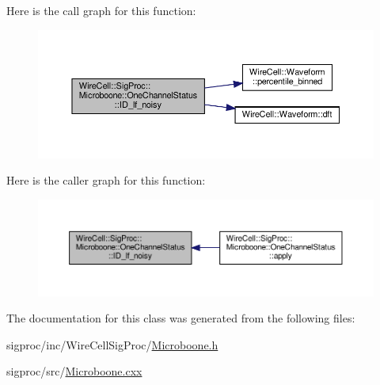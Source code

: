 Here is the call graph for this function\+:
\nopagebreak
\begin{figure}[H]
\begin{center}
\leavevmode
\includegraphics[width=350pt]{class_wire_cell_1_1_sig_proc_1_1_microboone_1_1_one_channel_status_a3836d07fe79d2efedd72838ac4e13d92_cgraph}
\end{center}
\end{figure}
Here is the caller graph for this function\+:
\nopagebreak
\begin{figure}[H]
\begin{center}
\leavevmode
\includegraphics[width=350pt]{class_wire_cell_1_1_sig_proc_1_1_microboone_1_1_one_channel_status_a3836d07fe79d2efedd72838ac4e13d92_icgraph}
\end{center}
\end{figure}


The documentation for this class was generated from the following files\+:\begin{DoxyCompactItemize}
\item 
sigproc/inc/\+Wire\+Cell\+Sig\+Proc/\hyperlink{_microboone_8h}{Microboone.\+h}\item 
sigproc/src/\hyperlink{_microboone_8cxx}{Microboone.\+cxx}\end{DoxyCompactItemize}
